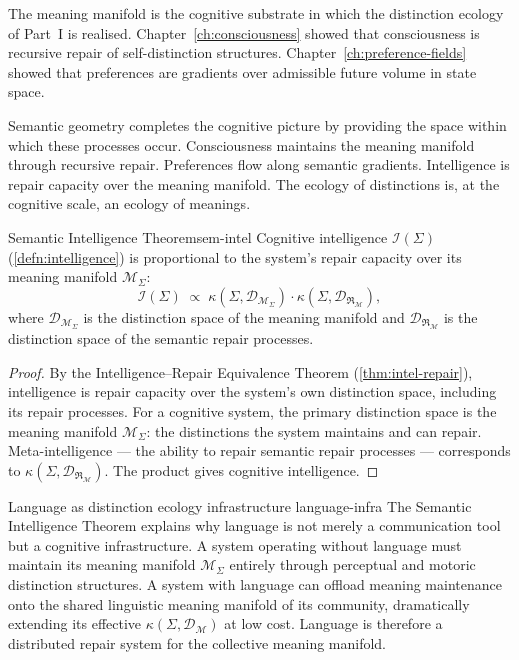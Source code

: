 \documentclass[12pt,twoside,openright]{book}
\newcommand{\repair}{\mathfrak{R}}
\begin{document}
The meaning manifold is the cognitive substrate in
which the distinction ecology of Part~I is realised.
Chapter~\ref{ch:consciousness} showed that
consciousness is recursive repair of self-distinction
structures. Chapter~\ref{ch:preference-fields} showed
that preferences are gradients over admissible future
volume in state space.

Semantic geometry completes the cognitive picture by
providing the space within which these processes occur.
Consciousness maintains the meaning manifold through
recursive repair. Preferences flow along semantic
gradients. Intelligence is repair capacity over
the meaning manifold. The ecology of distinctions
is, at the cognitive scale, an ecology of meanings.

\begin{theorem}{Semantic Intelligence Theorem}{sem-intel}
  Cognitive intelligence $\mathcal{I}(\Sigma)$
  (\cref{defn:intelligence}) is proportional to
  the system's repair capacity over its meaning
  manifold $\mathcal{M}_\Sigma$:
  \[
    \mathcal{I}(\Sigma)
    \;\propto\;
    \kappa(\Sigma, \mathcal{D}_{\mathcal{M}_\Sigma})
    \cdot
    \kappa(\Sigma, \mathcal{D}_{\repair_\mathcal{M}}),
  \]
  where $\mathcal{D}_{\mathcal{M}_\Sigma}$ is the
  distinction space of the meaning manifold and
  $\mathcal{D}_{\repair_\mathcal{M}}$ is the
  distinction space of the semantic repair processes.
\end{theorem}

\begin{proof}
  By the Intelligence--Repair Equivalence Theorem
  (\cref{thm:intel-repair}), intelligence is repair
  capacity over the system's own distinction space,
  including its repair processes.
  For a cognitive system, the primary distinction space
  is the meaning manifold $\mathcal{M}_\Sigma$:
  the distinctions the system maintains and can repair.
  Meta-intelligence — the ability to repair semantic
  repair processes — corresponds to
  $\kappa(\Sigma, \mathcal{D}_{\repair_\mathcal{M}})$.
  The product gives cognitive intelligence.
\end{proof}

\begin{remark}{Language as distinction ecology infrastructure}%
  {language-infra}
  The Semantic Intelligence Theorem explains why language
  is not merely a communication tool but a cognitive
  infrastructure.
  A system operating without language must maintain its
  meaning manifold $\mathcal{M}_\Sigma$ entirely through
  perceptual and motoric distinction structures.
  A system with language can offload meaning maintenance
  onto the shared linguistic meaning manifold of its
  community, dramatically extending its effective
  $\kappa(\Sigma, \mathcal{D}_\mathcal{M})$ at low cost.
  Language is therefore a distributed repair system for
  the collective meaning manifold.
\end{remark}
\end{document}
